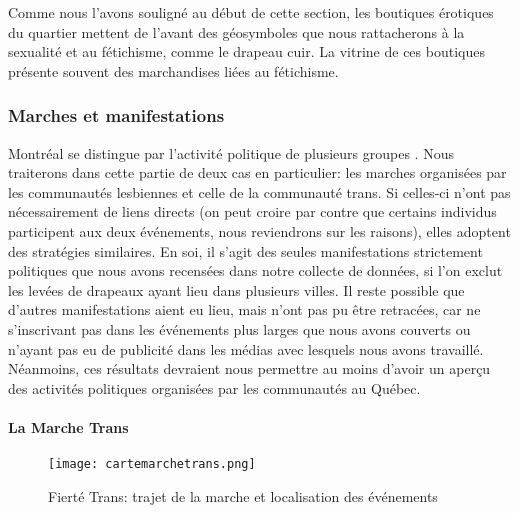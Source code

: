 Comme nous l'avons souligné au début de cette section, les boutiques érotiques du quartier mettent de l'avant des géosymboles que nous rattacherons à la sexualité et au fétichisme, comme le drapeau cuir.
La vitrine de ces boutiques présente souvent des marchandises liées au fétichisme.

\subsubsection{Marches et manifestations}
\label{subsec:label}
Montréal se distingue par l'activité politique de plusieurs groupes \lgbt{}.
Nous traiterons dans cette partie de deux cas en particulier: les marches organisées par les communautés lesbiennes et celle de la communauté trans.
Si celles-ci n'ont pas nécessairement de liens directs (on peut croire par contre que certains individus participent aux deux événements, nous reviendrons sur les raisons), elles adoptent des stratégies similaires.
En soi, il s'agit des seules manifestations strictement politiques que nous avons recensées dans notre collecte de données, si l'on exclut les levées de drapeaux ayant lieu dans plusieurs villes.
Il reste possible que d'autres manifestations aient eu lieu, mais n'ont pas pu être retracées, car ne s'inscrivant pas dans les événements plus larges que nous avons couverts ou n'ayant pas eu de publicité dans les médias avec lesquels nous avons travaillé.
Néanmoins, ces résultats devraient nous permettre au moins d'avoir un aperçu des activités politiques organisées par les communautés \lgbt{} au Québec.

\paragraph{La Marche Trans}
\label{subsubsec:marchetrans}

\begin{figure}[h]
  \centering
  \texttt{[image: cartemarchetrans.png]}
  \caption[Fierté Trans: trajet et événements]{Fierté Trans: trajet de la marche et localisation des événements}\label{fig:cartemarchetrans}
\end{figure}

